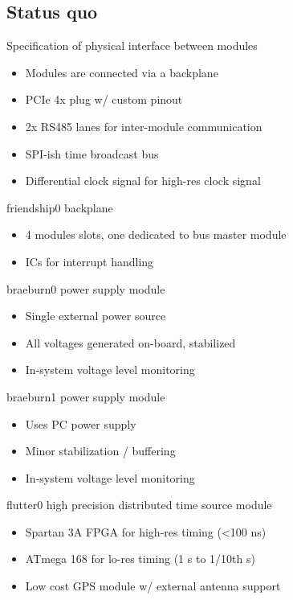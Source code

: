\subsection{Status quo}
  \begin{frame}{Specification of physical interface between modules}
		\begin{itemize}
			\item Modules are connected via a backplane
			\item PCIe 4x plug w/ custom pinout
			\item 2x RS485 lanes for inter-module communication
			\item SPI-ish time broadcast bus
			\item Differential clock signal for high-res clock signal
		\end{itemize}
	\end{frame}
	\begin{frame}{friendship0 backplane}
		\begin{itemize}
			\item 4 modules slots, one dedicated to bus master module
			\item ICs for interrupt handling
		\end{itemize}
	\end{frame}
	\begin{frame}{braeburn0 power supply module}
		\begin{itemize}
			\item Single external power source
			\item All voltages generated on-board, stabilized
			\item In-system voltage level monitoring
		\end{itemize}
	\end{frame}
	\begin{frame}{braeburn1 power supply module}
		\begin{itemize}
			\item Uses PC power supply
			\item Minor stabilization / buffering
			\item In-system voltage level monitoring
		\end{itemize}
	\end{frame}
	\begin{frame}{flutter0 high precision distributed time source module}
		\begin{itemize}
			\item Spartan 3A FPGA for high-res timing (<100 ns)
			\item ATmega 168 for lo-res timing (1 s to 1/10th s)
			\item Low cost GPS module w/ external antenna support
		\end{itemize}
	\end{frame}
